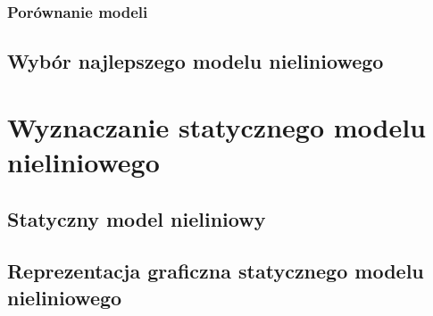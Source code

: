\documentclass[a4paper, 11pt]{article}
\begin{document}
\subsubsection{Porównanie modeli} %
\subsection{Wybór najlepszego modelu nieliniowego}


\section{Wyznaczanie statycznego modelu nieliniowego}
\subsection{Statyczny model nieliniowy}
\subsection{Reprezentacja graficzna statycznego modelu nieliniowego}
\end{document}
